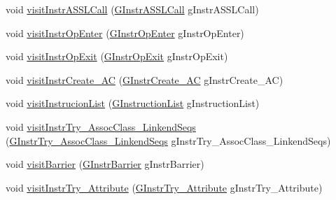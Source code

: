 \begin{DoxyCompactItemize}
\item 
void \hyperlink{interfaceorg_1_1tzi_1_1use_1_1gen_1_1assl_1_1statics_1_1_instruction_visitor_a1da9f8fc2b7c8666037b54277e875960}{visit\-Instr\-A\-S\-S\-L\-Call} (\hyperlink{classorg_1_1tzi_1_1use_1_1gen_1_1assl_1_1statics_1_1_g_instr_a_s_s_l_call}{G\-Instr\-A\-S\-S\-L\-Call} g\-Instr\-A\-S\-S\-L\-Call)
\item 
void \hyperlink{interfaceorg_1_1tzi_1_1use_1_1gen_1_1assl_1_1statics_1_1_instruction_visitor_a6296d5ec4d74549c336d99a3b9d7fa45}{visit\-Instr\-Op\-Enter} (\hyperlink{classorg_1_1tzi_1_1use_1_1gen_1_1assl_1_1statics_1_1_g_instr_op_enter}{G\-Instr\-Op\-Enter} g\-Instr\-Op\-Enter)
\item 
void \hyperlink{interfaceorg_1_1tzi_1_1use_1_1gen_1_1assl_1_1statics_1_1_instruction_visitor_ab6da2373a87a43225b9daa14e2dc5c41}{visit\-Instr\-Op\-Exit} (\hyperlink{classorg_1_1tzi_1_1use_1_1gen_1_1assl_1_1statics_1_1_g_instr_op_exit}{G\-Instr\-Op\-Exit} g\-Instr\-Op\-Exit)
\item 
void \hyperlink{interfaceorg_1_1tzi_1_1use_1_1gen_1_1assl_1_1statics_1_1_instruction_visitor_a2c789f7ec01b0a2353c0c8549369d787}{visit\-Instr\-Create\-\_\-\-A\-C} (\hyperlink{classorg_1_1tzi_1_1use_1_1gen_1_1assl_1_1statics_1_1_g_instr_create___a_c}{G\-Instr\-Create\-\_\-\-A\-C} g\-Instr\-Create\-\_\-\-A\-C)
\item 
void \hyperlink{interfaceorg_1_1tzi_1_1use_1_1gen_1_1assl_1_1statics_1_1_instruction_visitor_a68e7e0831ec45fbc47d47fe67b402044}{visit\-Instrucion\-List} (\hyperlink{classorg_1_1tzi_1_1use_1_1gen_1_1assl_1_1statics_1_1_g_instruction_list}{G\-Instruction\-List} g\-Instruction\-List)
\item 
void \hyperlink{interfaceorg_1_1tzi_1_1use_1_1gen_1_1assl_1_1statics_1_1_instruction_visitor_ad18a34cbe37efbcadc027b5b5b97efdc}{visit\-Instr\-Try\-\_\-\-Assoc\-Class\-\_\-\-Linkend\-Seqs} (\hyperlink{classorg_1_1tzi_1_1use_1_1gen_1_1assl_1_1statics_1_1_g_instr_try___assoc_class___linkend_seqs}{G\-Instr\-Try\-\_\-\-Assoc\-Class\-\_\-\-Linkend\-Seqs} g\-Instr\-Try\-\_\-\-Assoc\-Class\-\_\-\-Linkend\-Seqs)
\item 
void \hyperlink{interfaceorg_1_1tzi_1_1use_1_1gen_1_1assl_1_1statics_1_1_instruction_visitor_ac38c4e2c5a1dfcdda12421541de14382}{visit\-Barrier} (\hyperlink{classorg_1_1tzi_1_1use_1_1gen_1_1assl_1_1statics_1_1_g_instr_barrier}{G\-Instr\-Barrier} g\-Instr\-Barrier)
\item 
void \hyperlink{interfaceorg_1_1tzi_1_1use_1_1gen_1_1assl_1_1statics_1_1_instruction_visitor_ab68192bcc2c07576e7d7beb79f69aa67}{visit\-Instr\-Try\-\_\-\-Attribute} (\hyperlink{classorg_1_1tzi_1_1use_1_1gen_1_1assl_1_1statics_1_1_g_instr_try___attribute}{G\-Instr\-Try\-\_\-\-Attribute} g\-Instr\-Try\-\_\-\-Attribute)
\end{DoxyCompactItemize}



